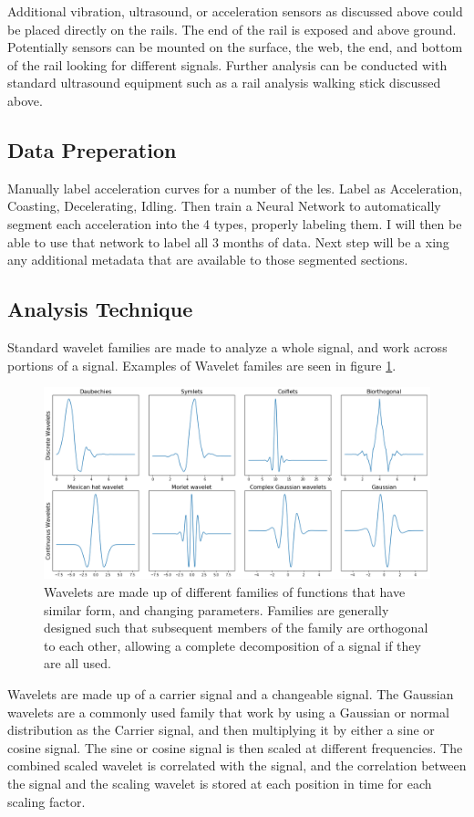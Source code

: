 \documentclass[journal=jacsat,manuscript=article]{achemso}
\begin{document}
Additional vibration, ultrasound, or acceleration sensors as discussed above could be placed directly on the rails.  The end of the rail is exposed and above ground.  Potentially sensors can be mounted on the surface, the web, the end, and bottom of the rail looking for different signals.  Further analysis can be conducted with standard ultrasound equipment such as a rail analysis walking stick discussed above.

\subsection{Data Preperation}
Manually label acceleration curves for a number of the les. Label as Acceleration, Coasting, Decelerating, Idling. Then train a Neural Network to automatically segment each acceleration into the 4 types, properly labeling them. I will then be able to use that network to label all 3 months of data. Next step will be a xing any additional metadata that are available to those segmented sections. 

\subsection{Analysis Technique}
Standard wavelet families are made to analyze a whole signal, and work across portions of a signal.  Examples of Wavelet familes are seen in figure \ref{fig:wavelet_families}.  

\begin{figure}
	\centering
	\includegraphics[width=0.7\linewidth]{"Figures/wavelet_families"}
	\caption[Wavelet Families]{Wavelets are made up of different families of functions that have similar form, and changing parameters.  Families are generally designed such that subsequent members of the family are orthogonal to each other, allowing a complete decomposition of a signal if they are all used.}
	\label{fig:wavelet_families}
\end{figure}
Wavelets are made up of a carrier signal and a changeable signal.  The Gaussian wavelets are a commonly used family that work by using a Gaussian or normal distribution as the Carrier signal, and then multiplying it by either a sine or cosine signal.  The sine or cosine signal is then scaled at different frequencies.  The combined scaled wavelet is correlated with the signal, and the correlation between the signal and the scaling wavelet is stored at each position in time for each scaling factor.
\end{document}
